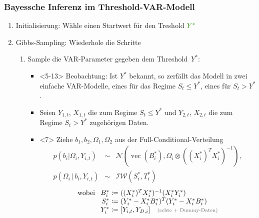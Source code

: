 \documentclass[10pt]{beamer}
\theoremstyle{definition}
\DeclareMathOperator{\Vector}{vec} %
\newcommand{\Normal}{\mathcal{N}} %
\newcommand{\InverseWishart}{\mathcal{IW}} %
\newcommand{\stepOne}[1]{\textcolor{StepOneColor}{#1}}
\newcommand{\stepTwo}[1]{\textcolor{StepTwoColor}{#1}}
\newcommand{\typeInfo}[1]{\textcolor{TypeInfoColor}{#1}}
\begin{document}
\begin{frame}[t]
  \frametitle{Bayessche Inferenz im Threshold-VAR-Modell}
  \begin{enumerate}
    \item<2->[A.] Initialisierung: Wähle einen Startwert für den Treshold $\stepTwo{Y^*}$ 
    \item<3->[B.] Gibbs-Sampling: Wiederhole die Schritte
    \begin{enumerate}
      \item<4->[\stepOne{1.}] Sample die \stepOne{VAR-Parameter} gegeben dem Threshold~\stepTwo{$Y^*$}:
      \begin{itemize}
        \item
        \begin{onlyenv}<5-13>
          Beobachtung: Ist $Y^*$ bekannt, so zerfällt das Modell in zwei einfache VAR-Modelle, eines für das Regime $S_t \leq Y^*$, eines für $S_t > Y^*$.
        \end{onlyenv}
        \item<6-> Seien $Y_{1,t}$, $X_{1,t}$ die zum Regime $S_t \leq Y^*$ und $Y_{2,t}$, $X_{2,t}$ die zum Regime $S_t > Y^*$ zugehörigen Daten.
        \item
        \begin{onlyenv}<7>
        Ziehe \stepOne{$b_1, b_2, \Omega_1, \Omega_2$} aus der Full-Conditional-Verteilung
        \[
          \begin{array}{rcl}
            p(b_i | \Omega_i, Y_{i,t}) &\sim& \Normal(\Vector(B_{i}^{*}), \Omega_i \otimes ((X_{i}^{*})^T X_{i}^{*})^{-1}), \\
            p(\Omega_i \,|\, b_i, Y_{i,t}) &\sim& \InverseWishart(S_{i}^{*}, T_{i}^{*})
          \end{array}
        \]
        \[
          \arraycolsep=1.5pt
          \begin{array}{rrcl}
            \text{wobei} \enspace
            & B_{i}^{*} &\coloneqq& ((X_{i}^{*})^T X_{i}^{*})^{-1} (X_{i}^{*} Y_{i}^{*}) \\
            & S_{i}^{*} &\coloneqq& (Y_{i}^{*} - X_{i}^{*} B_{i}^{*})^T (Y_{i}^* - X_{i}^* B_{i}^*) \\
            & Y_i^{*} &\coloneqq& [Y_{i,t}, Y_{D,i}] \quad \text{\scriptsize \typeInfo{(echte + Dummy-Daten)}} \\

\end{array}\]
\end{onlyenv}
\end{itemize}
\end{enumerate}
\end{enumerate}
\end{frame}
\end{document}
